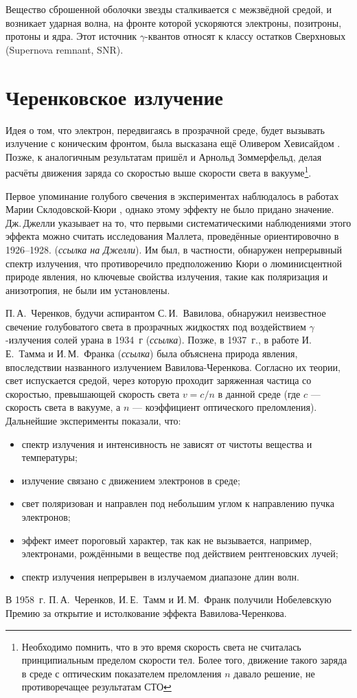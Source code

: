 \documentclass[magd,floatypics,numeref]{msudipl} %
\begin{document}
Вещество сброшенной оболочки звезды сталкивается с межзвёдной средой, и возникает ударная волна, на фронте которой ускоряются электроны, позитроны, протоны и ядра. Этот источник $\gamma$-квантов относят к классу остатков Сверхновых (Supernova remnant, SNR).
\section{Черенковское излучение}
Идея о том, что электрон, передвигаясь в прозрачной среде, будет вызывать излучение с коническим фронтом, была высказана ещё Оливером Хевисайдом \cite{heaviside1889xxxix}.
Позже, к аналогичным результатам \cite{tyapkin1974first} пришёл и Арнольд Зоммерфельд, делая расчёты движения заряда со скоростью выше скорости света в вакууме\footnote{Необходимо помнить, что в это время скорость света не считалась принципиальным пределом скорости тел. Более того, движение такого заряда в среде с оптическим показателем преломления $n$ давало решение, не противоречащее результатам СТО}. 

Первое упоминание голубого свечения в экспериментах наблюдалось в работах Марии Склодовской-Кюри \cite{mirzoyan2014brief}, однако этому эффекту не было придано значение. Дж.\,Джелли указывает на то, что первыми систематическими наблюдениями этого эффекта можно считать исследования Маллета, проведённые ориентировочно в 1926--1928. (\textit{ссылка на Джелли}). Им был, в частности, обнаружен непрерывный спектр излучения, что противоречило предположению Кюри о люминисцентной природе явления, но ключевые свойства излучения, такие как поляризация и анизотропия, не были им установлены. 

П.\,А.~Черенков, будучи аспирантом С.\,И.~Вавилова, обнаружил неизвестное свечение голубоватого света в прозрачных жидкостях под воздействием $\gamma$-излучения солей урана в 1934~г (\textit{ссылка}). Позже, в 1937~г., в работе И.\,Е.~Тамма и И.\,М.~Франка (\textit{ссылка}) была объяснена природа явления, впоследствии названного излучением Вавилова-Черенкова. Согласно их теории, свет испускается средой, через которую проходит заряженная частица со скоростью, превышающей скорость света $v=c/n$ в данной среде (где $c$ — скорость света в вакууме, а $n$ --- коэффициент оптического преломления). 
Дальнейшие эксперименты показали, что:
\begin{itemize}
\item спектр излучения и интенсивность не зависят от чистоты вещества и
температуры;
\item излучение связано с движением электронов в среде;
\item свет поляризован и направлен под небольшим углом к направлению
пучка электронов;
\item эффект имеет пороговый характер, так как не вызывается, например,
электронами, рождёнными в веществе под действием рентгеновских
лучей;
\item спектр излучения непрерывен в излучаемом диапазоне длин волн.
\end{itemize}
В 1958~г. П.\,А.~Черенков, И.\,Е.~Тамм и И.\,М.~Франк получили Нобелевскую Премию за открытие и истолкование эффекта Вавилова-Черенкова.
\end{document}
